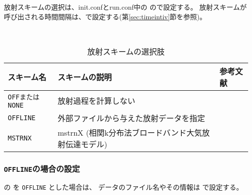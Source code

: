 \section{\SubsecRadiationSetting} \label{sec:basic_usel_radiation} %
放射スキームの選択は、init.confとrun.conf中の
ので設定する。
放射スキームが呼び出される時間間隔は、で設定する(第\ref{sec:timeintiv}節を参照)。

\\

\begin{table}[h]
\begin{center}
  \caption{放射スキームの選択肢}
  \label{tab:nml_atm_rd}
  \begin{tabularx}{150mm}{lXX} \hline
    \rowcolor[gray]{0.9}  スキーム名 & スキームの説明 & 参考文献\\ \hline
      \verb|OFFまたはNONE| & 放射過程を計算しない & \\
      \verb|OFFLINE|      & 外部ファイルから与えた放射データを指定 & \\
      \verb|MSTRNX|       & mstrnX (相関k分布法ブロードバンド大気放射伝達モデル)& \citet{sekiguchi_2008} \\
    \hline
  \end{tabularx}
\end{center}
\end{table}

\subsubsection{\texttt{OFFLINE}の場合の設定}

 の  を \verb|OFFLINE| とした場合は、
データのファイル名やその情報は で設定する。

